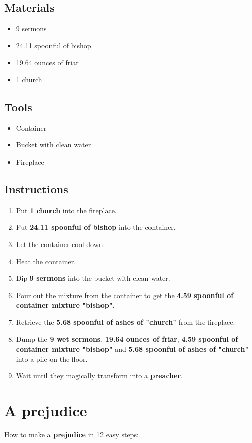 \documentclass{article}
\begin{document}
\subsection{Materials}\begin{itemize}
\item 
9 sermons
\item 
24.11 spoonful of bishop
\item 
19.64 ounces of friar
\item 
1 church
\end{itemize}
\subsection{Tools}\begin{itemize}
\item 
Container
\item 
Bucket with clean water
\item 
Fireplace
\end{itemize}
\subsection{Instructions}\begin{enumerate}
\item 
Put \textbf{1 church} into the fireplace.
\item 
Put \textbf{24.11 spoonful of bishop} into the container.
\item 
Let the container cool down.
\item 
Heat the container.
\item 
Dip \textbf{9 sermons} into the bucket with clean water.
\item 
Pour out the mixture from the container to get the \textbf{4.59 spoonful of container mixture "bishop"}.
\item 
Retrieve the \textbf{5.68 spoonful of ashes of "church"} from the fireplace.
\item 
Dump the \textbf{9 wet sermons}, \textbf{19.64 ounces of friar}, \textbf{4.59 spoonful of container mixture "bishop"} and \textbf{5.68 spoonful of ashes of "church"} into a pile on the floor.
\item 
Wait until they magically transform into a \textbf{preacher}.
\end{enumerate}
\newpage
\section{A prejudice}How to make a \textbf{prejudice} in 12 easy steps:
\end{document}
